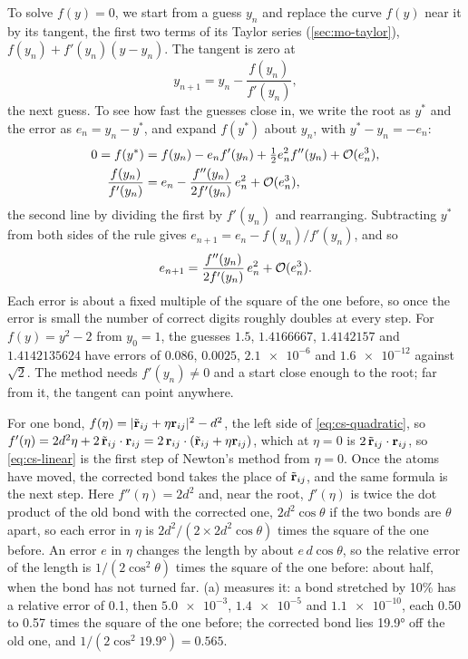\begin{toolbox}
To solve $f(y) = 0$, we start from a guess $y_n$ and replace the curve
$f(y)$ near it by its tangent, the first two terms of its Taylor series
(\cref{sec:mo-taylor}), $f(y_n) + f'(y_n)(y - y_n)$. The tangent is zero at
\begin{equation*}
   y_{n+1} = y_n - \frac{f(y_n)}{f'(y_n)} ,
\end{equation*}
the next guess. To see how fast the guesses close in, we write the root
as $y^*$ and the error as $e_n = y_n - y^*$, and expand $f(y^*)$ about
$y_n$, with $y^* - y_n = -e_n$:
\begin{align*}
   0 = f(y^*) &= f(y_n) - e_nf'(y_n) + \tfrac12e_n^2f''(y_n)
   + \mathcal{O}(e_n^3) ,\\
   \frac{f(y_n)}{f'(y_n)} &= e_n - \frac{f''(y_n)}{2f'(y_n)}\,e_n^2
   + \mathcal{O}(e_n^3) ,
\end{align*}
the second line by dividing the first by $f'(y_n)$ and rearranging.
Subtracting $y^*$ from both sides of the rule gives $e_{n+1} = e_n -
f(y_n)/f'(y_n)$, and so
\begin{equation*}
   e_{n+1} = \frac{f''(y_n)}{2f'(y_n)}\,e_n^2 + \mathcal{O}(e_n^3) .
\end{equation*}
Each error is about a fixed multiple of the square of the one before, so
once the error is small the number of correct digits roughly doubles at
every step. For $f(y) = y^2 - 2$ from $y_0 = 1$, the guesses $1.5$,
$1.4166667$, $1.4142157$ and $1.4142135624$ have errors of $0.086$,
$0.0025$, $\num{2.1e-6}$ and $\num{1.6e-12}$ against $\sqrt2$. The method
needs $f'(y_n) \neq 0$ and a start close enough to the root; far from it,
the tangent can point anywhere.
\end{toolbox}

For one bond, $f(\eta) = \lvert\tilde{\bm{\mathrm{r}}}_{ij} +
\eta\bm{\mathrm{r}}_{ij}\rvert^2 - d^2$, the left side of \cref{eq:cs-quadratic},
so $f'(\eta) = 2d^2\eta + 2\,\tilde{\bm{\mathrm{r}}}_{ij}\cdot\bm{\mathrm{r}}_{ij} =
2\,\bm{\mathrm{r}}_{ij}\cdot(\tilde{\bm{\mathrm{r}}}_{ij} + \eta\bm{\mathrm{r}}_{ij})$,
which at $\eta = 0$ is $2\,\tilde{\bm{\mathrm{r}}}_{ij}\cdot\bm{\mathrm{r}}_{ij}$, so
\cref{eq:cs-linear} is the first step of Newton's method from $\eta = 0$.
Once the atoms have moved, the corrected bond takes the place of
$\tilde{\bm{\mathrm{r}}}_{ij}$, and the same formula is the next step. Here
$f''(\eta) = 2d^2$ and, near the root, $f'(\eta)$ is twice the dot product
of the old bond with the corrected one, $2d^2\cos\theta$ if the two bonds
are $\theta$ apart, so each error in $\eta$ is $2d^2/(2\times2d^2\cos
\theta)$ times the square of the one before. An error $e$ in $\eta$ changes
the length by about $e\,d\cos\theta$, so the relative error of the length
is $1/(2\cos^2\theta)$ times the square of the one before: about half,
when the bond has not turned far. (a) measures it: a
bond stretched by 10\% has a relative error of 0.1, then $\num{5.0e-3}$,
$\num{1.4e-5}$ and $\num{1.1e-10}$, each 0.50 to 0.57 times the square of
the one before; the corrected bond lies \ang{19.9} off the old one, and
$1/(2\cos^2\ang{19.9}) = 0.565$.

